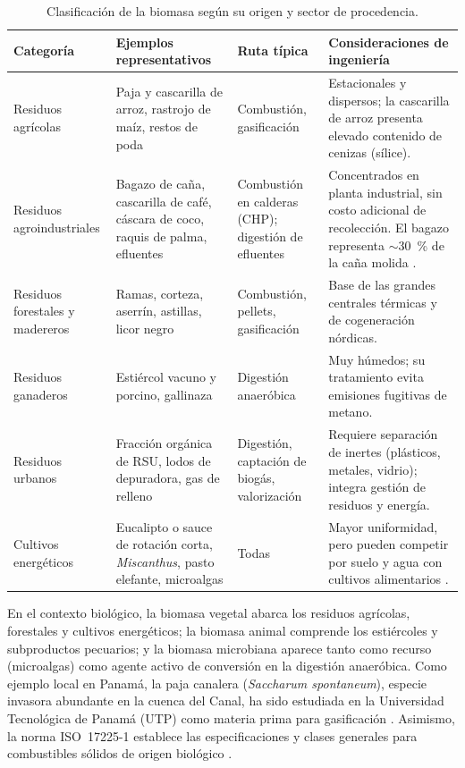 \begin{table}[htbp]
\centering
\small
\caption{Clasificación de la biomasa según su origen y sector de procedencia.}
\label{tab:clasificacion_origen}
\begin{tabularx}{\textwidth}{@{}p{2.6cm} X p{2.7cm} X@{}}
\toprule
\textbf{Categoría} & \textbf{Ejemplos representativos} & \textbf{Ruta típica} & \textbf{Consideraciones de ingeniería} \\
\midrule
Residuos agrícolas & Paja y cascarilla de arroz, rastrojo de maíz, restos de poda & Combustión, gasificación & Estacionales y dispersos; la cascarilla de arroz presenta elevado contenido de cenizas (sílice). \\
Residuos agroindustriales & Bagazo de caña, cascarilla de café, cáscara de coco, raquis de palma, efluentes & Combustión en calderas (CHP); digestión de efluentes & Concentrados en planta industrial, sin costo adicional de recolección. El bagazo representa $\sim$30~\% de la caña molida \cite{er2019centroamerica}. \\
Residuos forestales y madereros & Ramas, corteza, aserrín, astillas, licor negro & Combustión, pellets, gasificación & Base de las grandes centrales térmicas y de cogeneración nórdicas. \\
Residuos ganaderos & Estiércol vacuno y porcino, gallinaza & Digestión anaeróbica & Muy húmedos; su tratamiento evita emisiones fugitivas de metano. \\
Residuos urbanos & Fracción orgánica de RSU, lodos de depuradora, gas de relleno & Digestión, captación de biogás, valorización & Requiere separación de inertes (plásticos, metales, vidrio); integra gestión de residuos y energía. \\
Cultivos energéticos & Eucalipto o sauce de rotación corta, \textit{Miscanthus}, pasto elefante, microalgas & Todas & Mayor uniformidad, pero pueden competir por suelo y agua con cultivos alimentarios \cite{fao2016befs}. \\
\bottomrule
\end{tabularx}
\end{table}

En el contexto biológico, la biomasa vegetal abarca los residuos agrícolas, forestales y cultivos energéticos; la biomasa animal comprende los estiércoles y subproductos pecuarios; y la biomasa microbiana aparece tanto como recurso (microalgas) como agente activo de conversión en la digestión anaeróbica. Como ejemplo local en Panamá, la paja canalera (\textit{Saccharum spontaneum}), especie invasora abundante en la cuenca del Canal, ha sido estudiada en la Universidad Tecnológica de Panamá (UTP) como materia prima para gasificación \cite{utp_pajacanalera}. Asimismo, la norma ISO~17225-1 establece las especificaciones y clases generales para combustibles sólidos de origen biológico \cite{iso17225}.

